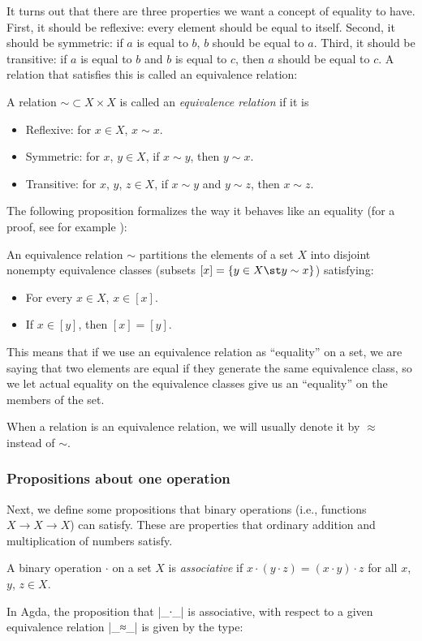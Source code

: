 It turns out that there are three properties we want a concept of equality to have. First, it should be reflexive: every element should be equal to itself. Second, it should be symmetric: if $a$ is equal to $b$, $b$ should be equal to $a$. Third, it should be transitive: if $a$ is equal to $b$ and $b$ is equal to $c$, then $a$ should be equal to $c$. A relation that satisfies this is called an equivalence relation:
\begin{Definition}
  A relation $\mathbin{\sim} \subset X \times X$ is called an \emph{equivalence relation} if it is
  \begin{itemize}
  \item Reflexive: for $x \in X$, $x \sim x$.
  \item Symmetric: for $x$, $y \in X$, if $x \sim y$, then $y \sim x$.
  \item Transitive: for $x$, $y$, $z \in X$, if $x \sim y$ and $y \sim z$, then $x \sim z$.
  \end{itemize}
\end{Definition}
The following proposition formalizes the way it behaves like an equality (for a proof, see for example \cite{Equivalence-proof}):
\begin{Proposition}
An equivalence relation $\sim$ partitions the elements of a set $X$ into disjoint nonempty equivalence classes (subsets $[x] = \{y \in X \st y \sim x\}$) satisfying: 
\begin{itemize}
\item For every $x \in X$, $x \in [x]$.
\item If $x \in [y]$, then $[x] = [y]$.
\end{itemize}
\end{Proposition}
This means that if we use an equivalence relation as ``equality'' on a set, we are saying that two elements are equal if they generate the same equivalence class, so we let actual equality on the equivalence classes give us an ``equality'' on the members of the set.

When a relation is an equivalence relation, we will usually denote it by $\approx$ instead of $\sim$.



\subsubsection{Propositions about one operation}
Next, we define some propositions that binary operations (i.e., functions $X \to X \to X$) can satisfy. These are properties that ordinary addition and multiplication of numbers satisfy.
\begin{Definition} %
A binary operation $\cdot$ on a set $X$ is \emph{associative} if $x \cdot (y \cdot z) = (x \cdot y) \cdot z$ for all $x$, $y$, $z \in X$.
\end{Definition}
In Agda, the proposition that |_∙_| is associative, with respect to a given equivalence relation |_≈_| is given by the type:

